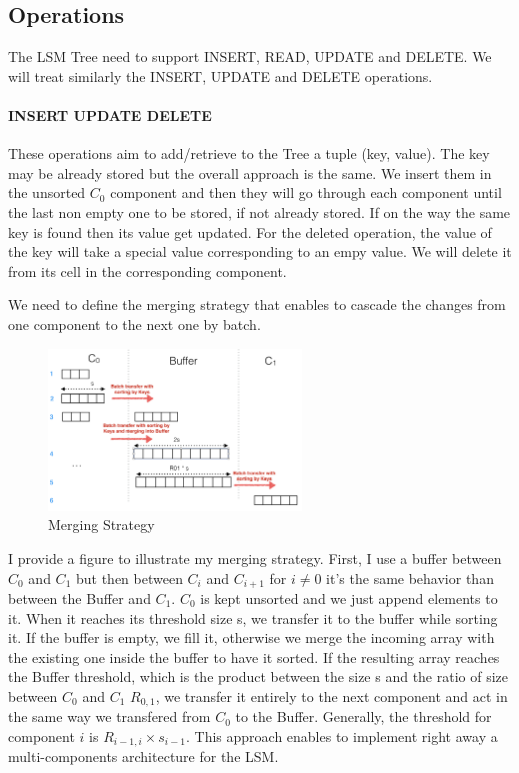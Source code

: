 \documentclass[submit]{harvardml}
\theoremstyle{plain}
\begin{document}
\subsection*{Operations}

The LSM Tree need to support INSERT, READ, UPDATE and DELETE. We will treat similarly the INSERT, UPDATE and DELETE operations.

\paragraph{INSERT UPDATE DELETE}
These operations aim to add/retrieve to the Tree a tuple (key, value). The key may be already stored but the overall approach is the same. We insert them in the unsorted $C_0$ component and then they will go through each component until the last non empty one to be stored, if not already stored. If on the way the same key is found then its value get updated. For the deleted operation, the value of the key will take a special value corresponding to an empy value. We will delete it from its cell in the corresponding component.

We need to define the merging strategy that enables to cascade the changes from one component to the next one by batch.

\begin{figure}[H]
\begin{center}
    \includegraphics[width=0.6\textwidth]{merge}
    \caption{Merging Strategy}
\end{center}
\end{figure}

I provide a figure to illustrate my merging strategy. First, I use a buffer between $C_0$ and $C_1$ but then between $C_i$ and $C_{i+1}$ for $i \neq 0$ it's the same behavior than between the Buffer and $C_1$. $C_0$ is kept unsorted and we just append elements to it. When it reaches its threshold size s, we transfer it to the buffer while sorting it. If the buffer is empty, we fill it, otherwise we merge the incoming array with the existing one inside the buffer to have it sorted. If the resulting array reaches the Buffer threshold, which is the product between the size s and the ratio of size between $C_0$ and $C_1$ $R_{0,1}$, we transfer it entirely to the next component and act in the same way we transfered from $C_0$ to the Buffer. Generally, the threshold for component $i$ is $R_{i-1,i} \times s_{i-1}$. This approach enables to implement right away a multi-components architecture for the LSM.
\end{document}
